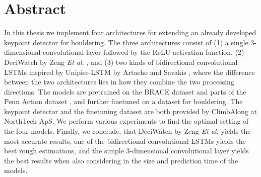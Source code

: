 \documentclass[./main.tex]{subfiles}
\begin{document}
\section*{Abstract}
In this thesis we implement four architectures for extending an already developed keypoint detector for bouldering. The three architectures consist of (1) a single 3-dimensional convolutional layer followed by the ReLU activation function, (2) DeciWatch by Zeng \textit{Et al.} \cite{https://doi.org/10.48550/arxiv.2203.08713}, and (3) two kinds of bidirectional convolutional LSTMs inspired by Unipise-LSTM by Artacho and Savakis \cite{https://doi.org/10.48550/arxiv.2001.08095}, where the difference between the two architectures lies in how they combine the two processing directions. The models are pretrained on the BRACE dataset \cite{BRACE} and parts of the Penn Action dataset \cite{penn_action}, and further finetuned on a dataset for bouldering. The keypoint detector and the finetuning dataset are both provided by ClimbAlong at NorthTech ApS. We perform various experiments to find the optimal setting of the four models. Finally, we conclude, that DeciWatch by Zeng \textit{Et al.} \cite{https://doi.org/10.48550/arxiv.2203.08713} yields the most accurate results, one of the bidirectional convolutional LSTMs yields the best rough estimations, and the simple 3-dimensional convolutional layer yields the best results when also considering in the size and prediction time of the models.
\end{document}

